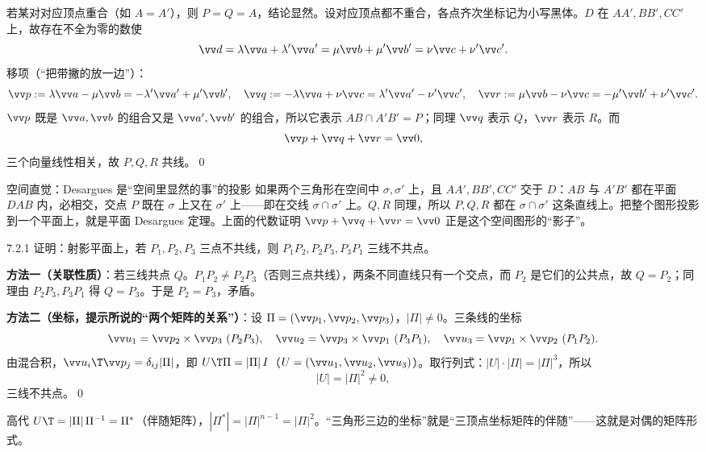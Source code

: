 \zheng 若某对对应顶点重合（如 $A=A'$），则 $P=Q=A$，结论显然。设对应顶点都不重合，各点齐次坐标记为小写黑体。$D$ 在 $AA',BB',CC'$ 上，故存在不全为零的数使
\begin{equation}
\vv d=\lambda\vv a+\lambda'\vv a'=\mu\vv b+\mu'\vv b'=\nu\vv c+\nu'\vv c'.
\end{equation}
移项（“把带撇的放一边”）：
\[
\vv p:=\lambda\vv a-\mu\vv b=-\lambda'\vv a'+\mu'\vv b',\quad
\vv q:=-\lambda\vv a+\nu\vv c=\lambda'\vv a'-\nu'\vv c',\quad
\vv r:=\mu\vv b-\nu\vv c=-\mu'\vv b'+\nu'\vv c'.
\]
$\vv p$ 既是 $\vv a,\vv b$ 的组合又是 $\vv a',\vv b'$ 的组合，所以它表示 $AB\cap A'B'=P$；同理 $\vv q$ 表示 $Q$，$\vv r$ 表示 $R$。而
\[
\vv p+\vv q+\vv r=\vv0,
\]
三个向量线性相关，故 $P,Q,R$ 共线。\qed

\begin{intbox}{空间直觉：Desargues 是“空间里显然的事”的投影}
如果两个三角形在空间中 $\sigma,\sigma'$ 上，且 $AA',BB',CC'$ 交于 $D$：$AB$ 与 $A'B'$ 都在平面 $DAB$ 内，必相交，交点 $P$ 既在 $\sigma$ 上又在 $\sigma'$ 上——即在交线 $\sigma\cap\sigma'$ 上。$Q,R$ 同理，所以 $P,Q,R$ 都在 $\sigma\cap\sigma'$ 这条直线上。把整个图形投影到一个平面上，就是平面 Desargues 定理。上面的代数证明 $\vv p+\vv q+\vv r=\vv0$ 正是这个空间图形的“影子”。
\end{intbox}


\begin{ex}{7.2.1}
证明：射影平面上，若 $P_1,P_2,P_3$ 三点不共线，则 $P_1P_2,P_2P_3,P_3P_1$ 三线不共点。
\end{ex}
\zheng\textbf{方法一（关联性质）}：若三线共点 $Q$。$P_1P_2\neq P_2P_3$（否则三点共线），两条不同直线只有一个交点，而 $P_2$ 是它们的公共点，故 $Q=P_2$；同理由 $P_2P_3,P_3P_1$ 得 $Q=P_3$。于是 $P_2=P_3$，矛盾。

\textbf{方法二（坐标，提示所说的“两个矩阵的关系”）}：设 $\Pi=(\vv p_1,\vv p_2,\vv p_3)$，$|\Pi|\neq0$。三条线的坐标
\[
\vv u_1=\vv p_2\times\vv p_3\ (P_2P_3),\quad \vv u_2=\vv p_3\times\vv p_1\ (P_3P_1),\quad \vv u_3=\vv p_1\times\vv p_2\ (P_1P_2).
\]
由混合积，$\vv u_i\T\vv p_j=\delta_{ij}|\Pi|$，即 $U\T\Pi=|\Pi|\,I$（$U=(\vv u_1,\vv u_2,\vv u_3)$）。取行列式：$|U|\cdot|\Pi|=|\Pi|^3$，所以
\[
|U|=|\Pi|^2\neq0,
\]
三线不共点。\qed

\begin{gdbox}{高代}
$U\T=|\Pi|\,\Pi^{-1}=\Pi^*$（伴随矩阵），$|\Pi^*|=|\Pi|^{n-1}=|\Pi|^2$。“三角形三边的坐标”就是“三顶点坐标矩阵的伴随”——这就是对偶的矩阵形式。
\end{gdbox}

